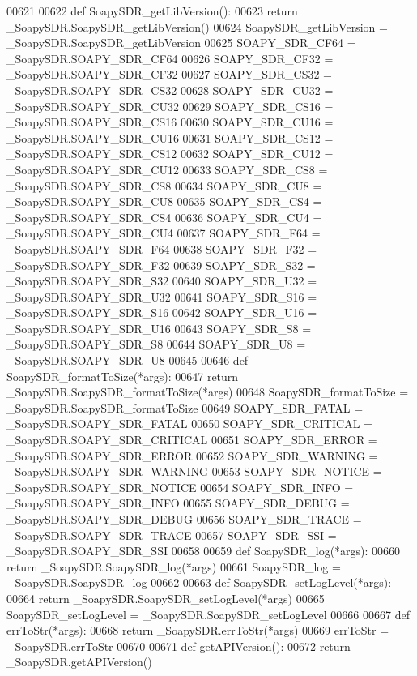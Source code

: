 \begin{DoxyCode}
{{{{{00621 
00622 \textcolor{keyword}{def }SoapySDR_getLibVersion():
00623   \textcolor{keywordflow}{return} \_SoapySDR.SoapySDR\_getLibVersion()
00624 SoapySDR\_getLibVersion = \_SoapySDR.SoapySDR\_getLibVersion
00625 SOAPY\_SDR\_CF64 = \_SoapySDR.SOAPY\_SDR\_CF64
00626 SOAPY\_SDR\_CF32 = \_SoapySDR.SOAPY\_SDR\_CF32
00627 SOAPY\_SDR\_CS32 = \_SoapySDR.SOAPY\_SDR\_CS32
00628 SOAPY\_SDR\_CU32 = \_SoapySDR.SOAPY\_SDR\_CU32
00629 SOAPY\_SDR\_CS16 = \_SoapySDR.SOAPY\_SDR\_CS16
00630 SOAPY\_SDR\_CU16 = \_SoapySDR.SOAPY\_SDR\_CU16
00631 SOAPY\_SDR\_CS12 = \_SoapySDR.SOAPY\_SDR\_CS12
00632 SOAPY\_SDR\_CU12 = \_SoapySDR.SOAPY\_SDR\_CU12
00633 SOAPY\_SDR\_CS8 = \_SoapySDR.SOAPY\_SDR\_CS8
00634 SOAPY\_SDR\_CU8 = \_SoapySDR.SOAPY\_SDR\_CU8
00635 SOAPY\_SDR\_CS4 = \_SoapySDR.SOAPY\_SDR\_CS4
00636 SOAPY\_SDR\_CU4 = \_SoapySDR.SOAPY\_SDR\_CU4
00637 SOAPY\_SDR\_F64 = \_SoapySDR.SOAPY\_SDR\_F64
00638 SOAPY\_SDR\_F32 = \_SoapySDR.SOAPY\_SDR\_F32
00639 SOAPY\_SDR\_S32 = \_SoapySDR.SOAPY\_SDR\_S32
00640 SOAPY\_SDR\_U32 = \_SoapySDR.SOAPY\_SDR\_U32
00641 SOAPY\_SDR\_S16 = \_SoapySDR.SOAPY\_SDR\_S16
00642 SOAPY\_SDR\_U16 = \_SoapySDR.SOAPY\_SDR\_U16
00643 SOAPY\_SDR\_S8 = \_SoapySDR.SOAPY\_SDR\_S8
00644 SOAPY\_SDR\_U8 = \_SoapySDR.SOAPY\_SDR\_U8
00645 
00646 \textcolor{keyword}{def }SoapySDR_formatToSize(*args):
00647   \textcolor{keywordflow}{return} \_SoapySDR.SoapySDR\_formatToSize(*args)
00648 SoapySDR\_formatToSize = \_SoapySDR.SoapySDR\_formatToSize
00649 SOAPY\_SDR\_FATAL = \_SoapySDR.SOAPY\_SDR\_FATAL
00650 SOAPY\_SDR\_CRITICAL = \_SoapySDR.SOAPY\_SDR\_CRITICAL
00651 SOAPY\_SDR\_ERROR = \_SoapySDR.SOAPY\_SDR\_ERROR
00652 SOAPY\_SDR\_WARNING = \_SoapySDR.SOAPY\_SDR\_WARNING
00653 SOAPY\_SDR\_NOTICE = \_SoapySDR.SOAPY\_SDR\_NOTICE
00654 SOAPY\_SDR\_INFO = \_SoapySDR.SOAPY\_SDR\_INFO
00655 SOAPY\_SDR\_DEBUG = \_SoapySDR.SOAPY\_SDR\_DEBUG
00656 SOAPY\_SDR\_TRACE = \_SoapySDR.SOAPY\_SDR\_TRACE
00657 SOAPY\_SDR\_SSI = \_SoapySDR.SOAPY\_SDR\_SSI
00658 
00659 \textcolor{keyword}{def }SoapySDR_log(*args):
00660   \textcolor{keywordflow}{return} \_SoapySDR.SoapySDR\_log(*args)
00661 SoapySDR\_log = \_SoapySDR.SoapySDR\_log
00662 
00663 \textcolor{keyword}{def }SoapySDR_setLogLevel(*args):
00664   \textcolor{keywordflow}{return} \_SoapySDR.SoapySDR\_setLogLevel(*args)
00665 SoapySDR\_setLogLevel = \_SoapySDR.SoapySDR\_setLogLevel
00666 
00667 \textcolor{keyword}{def }errToStr(*args):
00668   \textcolor{keywordflow}{return} \_SoapySDR.errToStr(*args)
00669 errToStr = \_SoapySDR.errToStr
00670 
00671 \textcolor{keyword}{def }getAPIVersion():
00672   \textcolor{keywordflow}{return} \_SoapySDR.getAPIVersion()
}}}}}
\end{DoxyCode}
